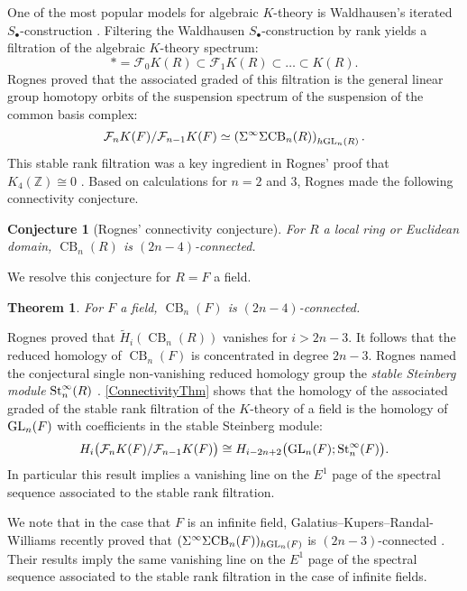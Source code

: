 \documentclass[a4paper]{amsart}
\DeclareMathOperator{\CB}{CB}
\newcommand{\Z}{\mathbb{Z}}
\numberwithin{theoremcounter}{section}
\newtheorem{theorem}[theoremauto]{Theorem}
\newtheorem{conjecture}[conjectureauto]{Conjecture}
\theoremstyle{definition}
\theoremstyle{remark}
\newcommand{\mr}[1]{{\rm #1}}
\newcommand{\GL}{\mr{GL}}
\newcommand{\St}{\mr{St}}
\begin{document}
One of the most popular models for algebraic $K$-theory is Waldhausen's iterated $S_\bullet$-construction \cite{WaldhausenSource}.  Filtering the Waldhausen $S_\bullet$-construction by rank yields a filtration of the algebraic $K$-theory spectrum: 
\[*=\mathcal{F}_0K(R) \subset \mathcal{F}_1K(R) \subset \dots \subset K(R).\]
Rognes  \cite{Rog1} proved that the associated graded of this filtration is the general linear group homotopy orbits of the suspension spectrum of the suspension  of the common basis complex: \[\mathcal{F}_{n}K(F)/\mathcal{F}_{n-1}K(F) \simeq \left(\Sigma^{\infty}\Sigma {\CB}_n(R) \right)_{h\GL_n(R)}.\] This stable rank filtration was a key ingredient in Rognes' proof that $K_4(\Z) \cong 0$ \cite{RognesK4}. Based on calculations for $n=2$ and $3$, Rognes \cite[Conjecture 12.3]{Rog1} made the following connectivity conjecture.

\begin{conjecture}[Rognes' connectivity conjecture]
For $R$ a local ring or Euclidean domain, ${\CB}_n(R)$ is $(2n-4)$-connected.
\end{conjecture}

We resolve this conjecture for $R=F$ a field.

\begin{theorem}\label{ConnectivityThm}
For $F$ a field, $ {\CB}_n(F)$ is $(2n-4)$-connected. 
\end{theorem}

Rognes  \cite{Rog1} proved that  $\widetilde{H}_i({\CB}_n(R))$ vanishes for $i>2n-3$. It follows that the reduced homology of ${\CB}_n(F)$ is concentrated in degree $2n-3$. Rognes named the conjectural single non-vanishing reduced homology group the \emph{stable Steinberg module} $\St^{\infty}_n(R)$ \cite[Definition 11.3]{Rognes96}. \autoref{ConnectivityThm} shows that the homology of the associated graded of the stable rank filtration of the $K$-theory of a field is the homology of $\GL_n(F)$ with coefficients in the stable Steinberg module:
$$H_i\big(\mathcal{F}_n K(F)/ \mathcal{F}_{n-1}K(F)\big) \cong H_{i-2n+2}\big(\GL_n(F); \St^{\infty}_n(F)\big).$$
In particular this result implies a vanishing line on the $E^1$ page of the spectral sequence associated to the stable rank filtration. 

We note that in the case that $F$ is an infinite field, Galatius--Kupers--Randal-Williams recently proved that $(\Sigma^{\infty} \Sigma {\CB}_n(F))_{h\GL_n(F)}$ is $(2n-3)$-connected \cite[Theorem C]{e2cellsIV}.  Their results imply the same vanishing line on the $E^1$ page of the spectral sequence associated to the stable rank filtration in the case of infinite fields. 
\end{document}
